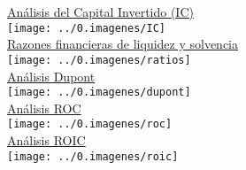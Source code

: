 \begin{figure}[H]
\centering

\underline{An\'alisis del Capital Invertido (IC)}\\[10pt]
\texttt{[image: ../0.imagenes/IC]}\\[10pt]

\underline{Razones financieras de liquidez y solvencia}\\[10pt]
\texttt{[image: ../0.imagenes/ratios]}\\[10pt]

\underline{An\'alisis Dupont}\\[10pt]
\texttt{[image: ../0.imagenes/dupont]}\\[10pt]

\underline{An\'alisis ROC}\\[10pt]
\texttt{[image: ../0.imagenes/roc]}\\[10pt]


\underline{An\'alisis ROIC}\\[10pt]
\texttt{[image: ../0.imagenes/roic]}\\[10pt]

\end{figure}



